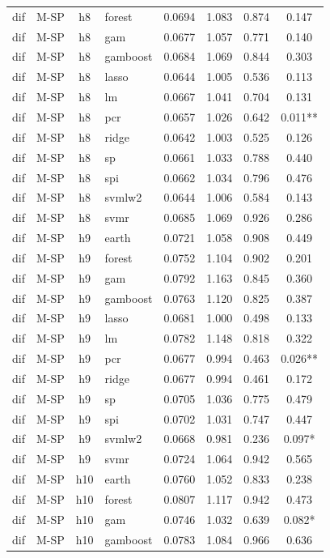 \begin{ThreePartTable}
\begin{longtable}[t]{llclcccc}
dif & M-SP & h8 & forest & 0.0694 & 1.083 & 0.874 & 0.147\\
dif & M-SP & h8 & gam & 0.0677 & 1.057 & 0.771 & 0.140\\
dif & M-SP & h8 & gamboost & 0.0684 & 1.069 & 0.844 & 0.303\\
dif & M-SP & h8 & lasso & 0.0644 & 1.005 & 0.536 & 0.113\\
dif & M-SP & h8 & lm & 0.0667 & 1.041 & 0.704 & 0.131\\
dif & M-SP & h8 & pcr & 0.0657 & 1.026 & 0.642 & 0.011**\\
dif & M-SP & h8 & ridge & 0.0642 & 1.003 & 0.525 & 0.126\\
dif & M-SP & h8 & sp & 0.0661 & 1.033 & 0.788 & 0.440\\
dif & M-SP & h8 & spi & 0.0662 & 1.034 & 0.796 & 0.476\\
dif & M-SP & h8 & svmlw2 & 0.0644 & 1.006 & 0.584 & 0.143\\
dif & M-SP & h8 & svmr & 0.0685 & 1.069 & 0.926 & 0.286\\
\addlinespace
dif & M-SP & h9 & earth & 0.0721 & 1.058 & 0.908 & 0.449\\
dif & M-SP & h9 & forest & 0.0752 & 1.104 & 0.902 & 0.201\\
dif & M-SP & h9 & gam & 0.0792 & 1.163 & 0.845 & 0.360\\
dif & M-SP & h9 & gamboost & 0.0763 & 1.120 & 0.825 & 0.387\\
dif & M-SP & h9 & lasso & 0.0681 & 1.000 & 0.498 & 0.133\\
dif & M-SP & h9 & lm & 0.0782 & 1.148 & 0.818 & 0.322\\
dif & M-SP & h9 & pcr & 0.0677 & 0.994 & 0.463 & 0.026**\\
dif & M-SP & h9 & ridge & 0.0677 & 0.994 & 0.461 & 0.172\\
dif & M-SP & h9 & sp & 0.0705 & 1.036 & 0.775 & 0.479\\
dif & M-SP & h9 & spi & 0.0702 & 1.031 & 0.747 & 0.447\\
dif & M-SP & h9 & svmlw2 & 0.0668 & 0.981 & 0.236 & 0.097*\\
dif & M-SP & h9 & svmr & 0.0724 & 1.064 & 0.942 & 0.565\\
\addlinespace
dif & M-SP & h10 & earth & 0.0760 & 1.052 & 0.833 & 0.238\\
dif & M-SP & h10 & forest & 0.0807 & 1.117 & 0.942 & 0.473\\
dif & M-SP & h10 & gam & 0.0746 & 1.032 & 0.639 & 0.082*\\
dif & M-SP & h10 & gamboost & 0.0783 & 1.084 & 0.966 & 0.636\\

\end{longtable}
\end{ThreePartTable}

